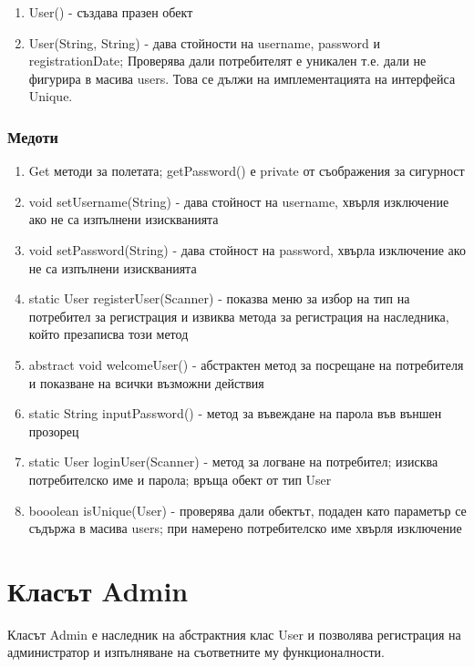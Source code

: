 \documentclass[12pt]{article}
\begin{document}
        \begin{enumerate}
            \item User() - създава празен обект
            \item User(String, String) - дава стойности на username, password и registrationDate; Проверява дали потребителят е уникален т.е. дали не фигурира в масива users. Това се дължи на имплементацията на интерфейса Unique.
        \end{enumerate}

    \subsubsection{Медоти}

        \begin{enumerate}
            \item Get методи за полетата; getPassword() е private от съображения за сигурност
            \item void setUsername(String) - дава стойност на username, хвърля изключение ако не са изпълнени изискванията
            \item void setPassword(String) - дава стойност на password, хвърла изключение ако не са изпълнени изискванията
            \item static User registerUser(Scanner) - показва меню за избор на тип на потребител за регистрация и извиква метода за регистрация на наследника, който презаписва този метод
            \item abstract void welcomeUser() - абстрактен метод за посрещане на потребителя и показване на всички възможни действия
            \item static String inputPassword() - метод за въвеждане на парола във външен прозорец
            \item static User loginUser(Scanner) - метод за логване на потребител; изисква потребителско име и парола; връща обект от тип User
            \item booolean isUnique(User) - проверява дали обектът, подаден като параметър се съдържа в масива users; при намерено потребителско име хвърля изключение
        \end{enumerate}

\section{Класът Admin}

    Класът Admin е наследник на абстрактния клас User и позволява регистрация на администратор и изпълняване на съответните му функционалности.
\end{document}
